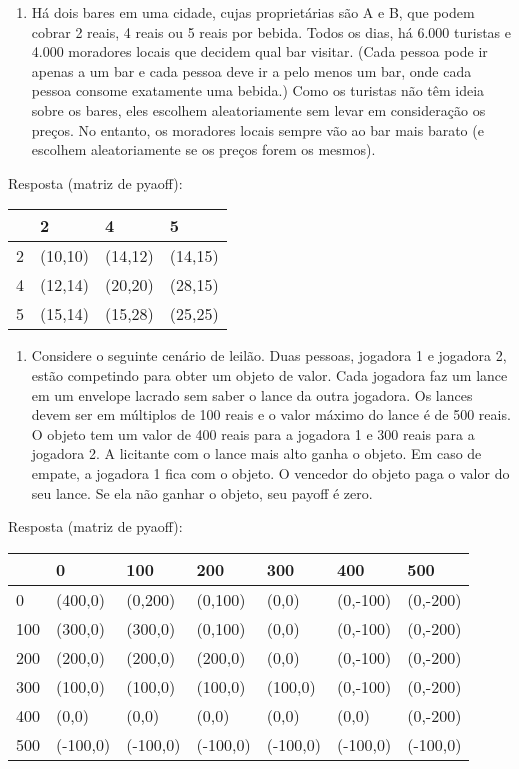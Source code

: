 \documentclass[
]{article}
\providecommand{\tightlist}{%
  \setlength{\itemsep}{0pt}\setlength{\parskip}{0pt}}
\begin{document}
\begin{enumerate}
\def\labelenumi{\arabic{enumi}.}
\setcounter{enumi}{8}
\tightlist
\item
  Há dois bares em uma cidade, cujas proprietárias são A e B, que podem
  cobrar 2 reais, 4 reais ou 5 reais por bebida. Todos os dias, há 6.000
  turistas e 4.000 moradores locais que decidem qual bar visitar. (Cada
  pessoa pode ir apenas a um bar e cada pessoa deve ir a pelo menos um
  bar, onde cada pessoa consome exatamente uma bebida.) Como os turistas
  não têm ideia sobre os bares, eles escolhem aleatoriamente sem levar
  em consideração os preços. No entanto, os moradores locais sempre vão
  ao bar mais barato (e escolhem aleatoriamente se os preços forem os
  mesmos).
\end{enumerate}

Resposta (matriz de pyaoff):

\begin{longtable}[]{@{}llll@{}}
\toprule
& 2 & 4 & 5\tabularnewline
\midrule
\endhead
2 & (10,10) & (14,12) & (14,15)\tabularnewline
4 & (12,14) & (20,20) & (28,15)\tabularnewline
5 & (15,14) & (15,28) & (25,25)\tabularnewline
\bottomrule
\end{longtable}

\begin{enumerate}
\def\labelenumi{\arabic{enumi}.}
\setcounter{enumi}{9}
\tightlist
\item
  Considere o seguinte cenário de leilão. Duas pessoas, jogadora 1 e
  jogadora 2, estão competindo para obter um objeto de valor. Cada
  jogadora faz um lance em um envelope lacrado sem saber o lance da
  outra jogadora. Os lances devem ser em múltiplos de 100 reais e o
  valor máximo do lance é de 500 reais. O objeto tem um valor de 400
  reais para a jogadora 1 e 300 reais para a jogadora 2. A licitante com
  o lance mais alto ganha o objeto. Em caso de empate, a jogadora 1 fica
  com o objeto. O vencedor do objeto paga o valor do seu lance. Se ela
  não ganhar o objeto, seu payoff é zero.
\end{enumerate}

Resposta (matriz de pyaoff):

\begin{longtable}[]{@{}lllllll@{}}
\toprule
& 0 & 100 & 200 & 300 & 400 & 500\tabularnewline
\midrule
\endhead
0 & (400,0) & (0,200) & (0,100) & (0,0) & (0,-100) &
(0,-200)\tabularnewline
100 & (300,0) & (300,0) & (0,100) & (0,0) & (0,-100) &
(0,-200)\tabularnewline
200 & (200,0) & (200,0) & (200,0) & (0,0) & (0,-100) &
(0,-200)\tabularnewline
300 & (100,0) & (100,0) & (100,0) & (100,0) & (0,-100) &
(0,-200)\tabularnewline
400 & (0,0) & (0,0) & (0,0) & (0,0) & (0,0) & (0,-200)\tabularnewline
500 & (-100,0) & (-100,0) & (-100,0) & (-100,0) & (-100,0) &
(-100,0)\tabularnewline
\bottomrule
\end{longtable}
\end{document}
